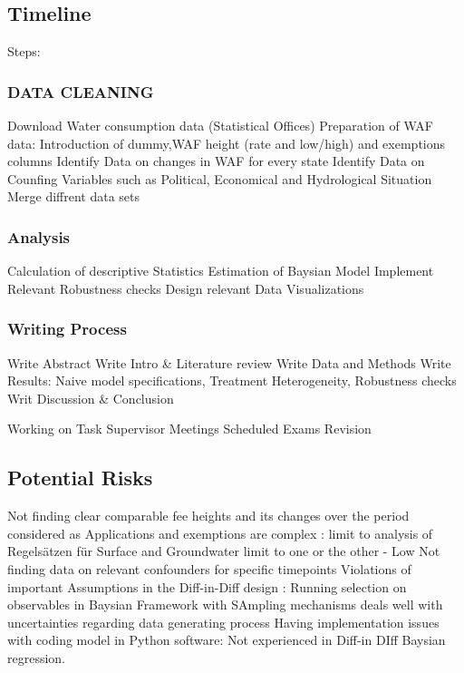 \documentclass[11pt]{article}
\begin{document}
\newpage
\subsection{Timeline}
\label{sec:org8aba279}

Steps:
\subsubsection{DATA CLEANING}
\label{sec:org7757f49}
Download Water consumption data (Statistical Offices)
Preparation of WAF data: Introduction of dummy,WAF height (rate and low/high) and exemptions columns
Identify Data on changes in WAF for every state
Identify Data on Counfing Variables such as Political, Economical and Hydrological Situation
Merge diffrent data sets
\subsubsection{Analysis}
\label{sec:orgcff3e2e}
Calculation of descriptive Statistics
Estimation of Baysian Model
Implement Relevant Robustness checks
Design relevant Data Visualizations 
\subsubsection{Writing Process}
\label{sec:org7e2ecd4}
Write Abstract
Write Intro \& Literature review
Write Data and Methods
Write Results: Naive model specifications, Treatment Heterogeneity, Robustness checks
Writ Discussion \& Conclusion

Working on Task
Supervisor Meetings
Scheduled Exams
Revision

\newpage
\subsection{Potential Risks}
\label{sec:org4aa7be7}
Not finding clear comparable fee heights and its changes over the period considered as Applications and exemptions are complex  : limit to analysis of Regelsätzen für Surface and Groundwater limit to one or the other - Low
Not finding data on relevant confounders for specific timepoints
Violations of important Assumptions in the Diff-in-Diff design : Running selection on observables in Baysian Framework with SAmpling mechanisms deals well with uncertainties regarding data generating process
Having implementation issues with coding model in Python software: Not  experienced in Diff-in DIff Baysian regression.
\end{document}
